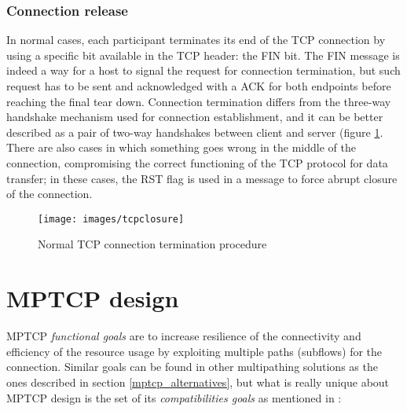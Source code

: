 \subsubsection{Connection release}
In normal cases, each participant terminates its end of the TCP connection by using a specific bit available in the TCP header: the FIN bit. The FIN message is indeed a way for a host to signal the request for connection termination, but such request has to be sent and acknowledged with a ACK for both endpoints before reaching the final tear down. Connection termination differs from the three-way handshake mechanism used for connection establishment, and it can be better described as a pair of two-way handshakes between client and server (figure \ref{fig:tcpclosure}.
There are also cases in which something goes wrong in the middle of the connection, compromising the correct functioning of the TCP protocol for data transfer; in these cases, the RST flag is used in a message to force abrupt closure of the connection.
 
\begin{figure}[!htb]
\centering
\texttt{[image: images/tcpclosure]}
\caption{Normal TCP connection termination procedure}
\label{fig:tcpclosure}
\end{figure}

\section{MPTCP design}
\label{mptcpdesign}
MPTCP \textit{functional goals} are to increase resilience of the connectivity and efficiency of the resource usage by exploiting multiple paths (subflows) for the connection.
Similar goals can be found in other multipathing solutions as the ones described in section \ref{mptcp_alternatives}, but what is really unique about MPTCP design is the set of its \textit{compatibilities goals} as mentioned in :

